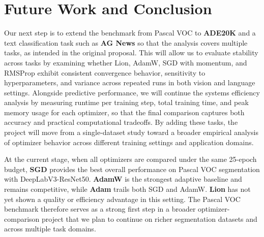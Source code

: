 \documentclass[10pt]{article}
\begin{document}
\section{Future Work and Conclusion}
Our next step is to extend the benchmark from Pascal VOC to \textbf{ADE20K} and a text classification task such as \textbf{AG News} so that the analysis covers multiple tasks, as intended in the original proposal. This will allow us to evaluate stability across tasks by examining whether Lion, AdamW, SGD with momentum, and RMSProp exhibit consistent convergence behavior, sensitivity to hyperparameters, and variance across repeated runs in both vision and language settings. Alongside predictive performance, we will continue the systems efficiency analysis by measuring runtime per training step, total training time, and peak memory usage for each optimizer, so that the final comparison captures both accuracy and practical computational tradeoffs. By adding these tasks, the project will move from a single-dataset study toward a broader empirical analysis of optimizer behavior across different training settings and application domains.

At the current stage, when all optimizers are compared under the same 25-epoch budget, \textbf{SGD} provides the best overall performance on Pascal VOC segmentation with DeepLabV3-ResNet50. \textbf{AdamW} is the strongest adaptive baseline and remains competitive, while \textbf{Adam} trails both SGD and AdamW. \textbf{Lion} has not yet shown a quality or efficiency advantage in this setting. The Pascal VOC benchmark therefore serves as a strong first step in a broader optimizer-comparison project that we plan to continue on richer segmentation datasets and across multiple task domains.
\end{document}
